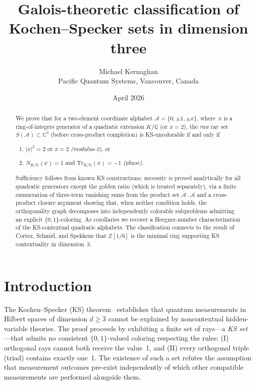 \documentclass[12pt,a4paper]{article}
\newcommand{\C}{\mathbb{C}}
\newcommand{\Z}{\mathbb{Z}}
\newcommand{\Q}{\mathbb{Q}}
\newcommand{\Norm}[1]{N_{K/\Q}\!\left(#1\right)}
\newcommand{\Tr}[1]{\mathrm{Tr}_{K/\Q}\!\left(#1\right)}
\begin{document}
\title{Galois-theoretic classification of Kochen--Specker sets
in dimension three}

\author{Michael Kernaghan\\
\small Pacific Quantum Systems, Vancouver, Canada}

\date{April 2026}

\maketitle

\begin{abstract}
\noindent
We prove that for a two-element coordinate alphabet
$\mathcal{A} = \{0, \pm 1, \pm x\}$, where~$x$ is a ring-of-integers
generator of a quadratic extension $K/\Q$ (or $x=2$), the \emph{raw}
ray set $S(\mathcal{A}) \subset \C^3$ (before cross-product completion)
is KS-uncolorable if and only if
\begin{enumerate}
\item[(i)] $|x|^2 = 2$ or $x = 2$ \emph{(modulus-2)}, or
\item[(ii)] $\Norm{x} = 1$ and $\Tr{x} = -1$ \emph{(phase)}.
\end{enumerate}
Sufficiency follows from known KS constructions; necessity is proved
analytically for all quadratic generators except the golden ratio
(which is treated separately),
via a finite enumeration of three-term vanishing sums from the product
set $\bar{\mathcal{A}} \cdot \mathcal{A}$ and a cross-product closure
argument showing that, when neither condition holds, the orthogonality
graph decomposes into independently colorable subproblems admitting an
explicit $\{0,1\}$-coloring.  As
corollaries we recover a Heegner-number characterization of the
KS-contextual quadratic alphabets.  The classification
connects to the result of Cortez, Schmid, and Spekkens that $\Z[1/6]$ is
the minimal ring supporting KS contextuality in dimension~3.
\end{abstract}

\section{Introduction}

The Kochen--Specker (KS) theorem~\cite{KochenSpecker1967} establishes
that quantum measurements in Hilbert spaces of dimension $d \geq 3$
cannot be explained by noncontextual hidden-variable theories.  The proof
proceeds by exhibiting a finite set of rays---a \emph{KS set}---that
admits no consistent $\{0,1\}$-valued coloring respecting the rules: (I)
orthogonal rays cannot both receive the value~1, and (II) every
orthogonal triple (triad) contains exactly one~1.  The existence of such
a set refutes the assumption that measurement outcomes pre-exist
independently of which other compatible measurements are performed
alongside them.
\end{document}
